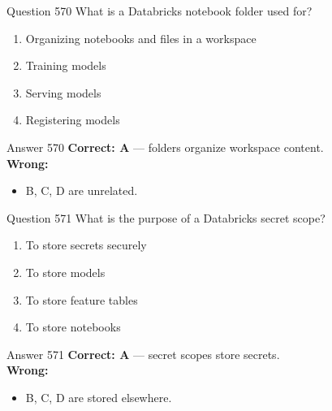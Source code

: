 \documentclass[aspectratio=169,11pt]{beamer}
\begin{document}
	\begin{frame}{Question 570}
		What is a Databricks notebook folder used for?
		\begin{enumerate}[label=\Alph*.]
			\item Organizing notebooks and files in a workspace
			\item Training models
			\item Serving models
			\item Registering models
		\end{enumerate}
	\end{frame}
	\begin{frame}{Answer 570}
		\textbf{Correct: A} --- folders organize workspace content.\\
		\vspace{0.5em}
		\textbf{Wrong:}
		\begin{itemize}
			\item B, C, D are unrelated.
		\end{itemize}
	\end{frame}
	
	\begin{frame}{Question 571}
		What is the purpose of a Databricks secret scope?
		\begin{enumerate}[label=\Alph*.]
			\item To store secrets securely
			\item To store models
			\item To store feature tables
			\item To store notebooks
		\end{enumerate}
	\end{frame}
	\begin{frame}{Answer 571}
		\textbf{Correct: A} --- secret scopes store secrets.\\
		\vspace{0.5em}
		\textbf{Wrong:}
		\begin{itemize}
			\item B, C, D are stored elsewhere.
		\end{itemize}
	\end{frame}
	
\end{document}
